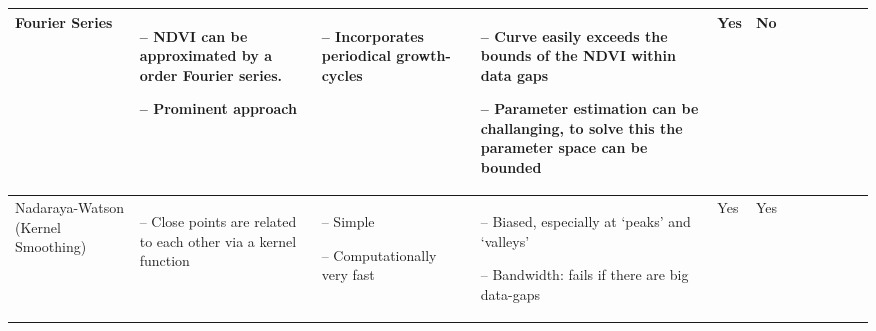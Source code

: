 \begin{table}[!ht]
\begin{tabular}{p{1.6cm}p{3.3cm}p{3.3cm}p{3.4cm}p{0.4cm}p{0.4cm}p{3cm}p{3cm}p{3cm}p{3cm}p{2.7cm}p{3cm}|}
		Fourier Series                                                                                                                                              &
		\begin{cptitemize} \item[--]  NDVI can be approximated by a \nth{2} order Fourier series.      \item[--] Prominent approach                      \end{cptitemize}        &
		\begin{cptitemize} \item[--]  Incorporates periodical growth-cycles                                 \end{cptitemize}        &
		\begin{cptitemize}  \item[--]  Curve easily exceeds the bounds of the NDVI within data gaps    \item[--]  Parameter estimation can be challanging, to solve this the parameter space can be bounded        \end{cptitemize}        &
		Yes                                                                                                                                                          &
		No                                                                                                                                                         \\ \hline%

		Nadaraya-Watson (Kernel Smoothing)                                                                                                                                  &
		\begin{cptitemize} \item[--]  Close points are related to each other via a kernel function \end{cptitemize}                                                                                                                                                            &
		\begin{cptitemize} \item[--]  Simple  \item[--]  Computationally very fast                                                             \end{cptitemize}        &
		\begin{cptitemize} \item[--]  Biased, especially at `peaks' and `valleys'   \item[--]  Bandwidth: fails if there are big data-gaps                                                     \end{cptitemize}               &
		Yes                                                                                                                                                          &
		Yes                                                                                                                                                            \\ \hline%


\end{tabular}
\end{table}
